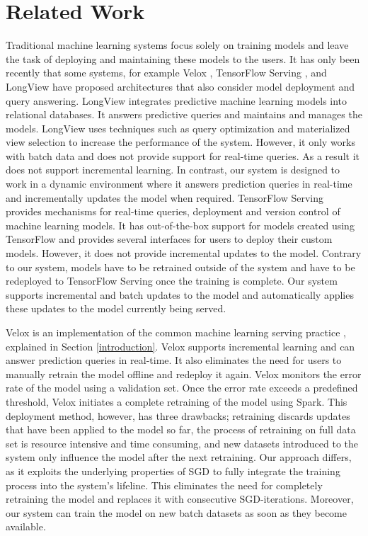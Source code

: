 
\section{Related Work} \label{related-work}
Traditional machine learning systems focus solely on training models and leave the task of deploying and maintaining these models to the users.
It has only been recently that some systems, for example Velox \cite{crankshaw2014missing}, TensorFlow Serving \cite{abadi2016tensorflow}, and LongView \cite{akdere2011case} have proposed architectures that also consider model deployment and query answering.
LongView integrates predictive machine learning models into relational databases. 
It answers predictive queries and maintains and manages the models.
LongView uses techniques such as query optimization and materialized view selection to increase the performance of the system.
However, it only works with batch data and does not provide support for real-time queries. 
As a result it does not support incremental learning.
In contrast, our system is designed to work in a dynamic environment where it answers prediction queries in real-time and incrementally updates the model when required.
TensorFlow Serving provides mechanisms for real-time queries, deployment and version control of machine learning models.
It has out-of-the-box support for models created using TensorFlow and provides several interfaces for users to deploy their custom models.
However, it does not provide incremental updates to the model.
Contrary to our system, models have to be retrained outside of the system and have to be redeployed to TensorFlow Serving once the training is complete.
Our system supports incremental and batch updates to the model and automatically applies these updates to the model currently being served.

Velox is an implementation of the common machine learning serving practice \cite{crankshaw2014missing}, explained in Section \ref{introduction}.
Velox supports incremental learning and can answer prediction queries in real-time.
It also eliminates the need for users to manually retrain the model offline and redeploy it again.
Velox monitors the error rate of the model using a validation set.
Once the error rate exceeds a predefined threshold, Velox initiates a complete retraining of the model using Spark. 
This deployment method, however, has three drawbacks; retraining discards updates that have been applied to the model so far, the process of retraining on full data set is resource intensive and time consuming, and new datasets introduced to the system only influence the model after the next retraining.
Our approach differs, as it exploits the underlying properties of SGD to fully integrate the training process into the system's lifeline.
This eliminates the need for completely retraining the model and replaces it with consecutive SGD-iterations.
Moreover, our system can train the model on new batch datasets as soon as they become available.

